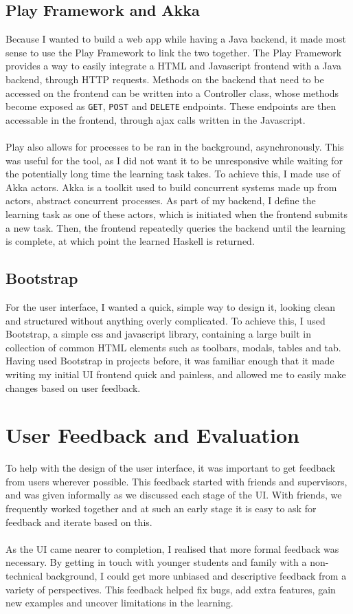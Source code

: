 \subsection{Play Framework and Akka}
Because I wanted to build a web app while having a Java backend, it made most sense to use the Play Framework to link the two together. The Play Framework provides a way to easily integrate a HTML and Javascript frontend with a Java backend, through HTTP requests. Methods on the backend that need to be accessed on the frontend can be written into a Controller class, whose methods become exposed as \lstinline{GET}, \lstinline{POST} and \lstinline{DELETE} endpoints. These endpoints are then accessable in the frontend, through ajax calls written in the Javascript. \\ \\%
Play also allows for processes to be ran in the background, asynchronously. This was useful for the tool, as I did not want it to be unresponsive while waiting for the potentially long time the learning task takes. To achieve this, I made use of Akka actors. Akka is a toolkit used to build concurrent systems made up from actors, abstract concurrent processes. As part of my backend, I define the learning task as one of these actors, which is initiated when the frontend submits a new task. Then, the frontend repeatedly queries the backend until the learning is complete, at which point the learned Haskell is returned.

\subsection{Bootstrap}
For the user interface, I wanted a quick, simple way to design it, looking clean and structured without anything overly complicated. To achieve this, I used Bootstrap, a simple css and javascript library, containing a large built in collection of common HTML elements such as toolbars, modals, tables and tab. Having used Bootstrap in projects before, it was familiar enough that it made writing my initial UI frontend quick and painless, and allowed me to easily make changes based on user feedback.

\section{User Feedback and Evaluation}
To help with the design of the user interface, it was important to get feedback from users wherever possible. This feedback started with friends and supervisors, and was given informally as we discussed each stage of the UI. With friends, we frequently worked together and at such an early stage it is easy to ask for feedback and iterate based on this. \\ \\
As the UI came nearer to completion, I realised that more formal feedback was necessary. By getting in touch with younger students and family with a non-technical background, I could get more unbiased and descriptive feedback from a variety of perspectives. This feedback helped fix bugs, add extra features, gain new examples and uncover limitations in the learning.


\pagebreak
%
%